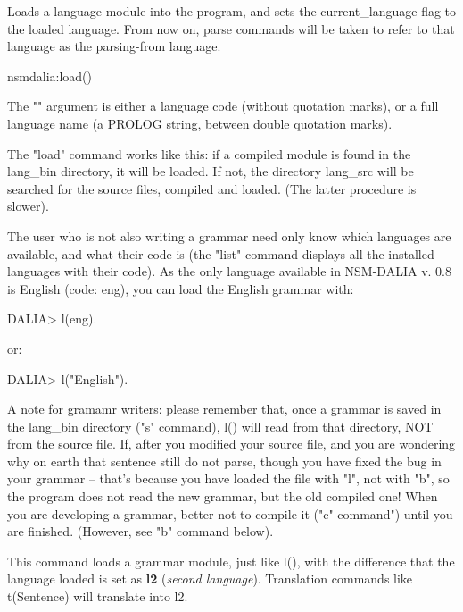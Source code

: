 \documentclass[11pt]{article}
\begin{document}
\begin{description}
Loads a language module into the program, and sets the
current_language flag to the loaded language. From now on, parse
commands will be taken to refer to that language as the parsing-from
language.

\begin{tags}
nsmdalia:load()

The "" argument is either a language code (without quotation
marks), or a full language name (a PROLOG string, between double
quotation marks).

The "load" command works like this: if a compiled module is found in
the lang_bin directory, it will be loaded. If not, the directory
lang_src will be searched for the source files, compiled and
loaded. (The latter procedure is slower).

The user who is not also writing a grammar need only know which
languages are available, and what their code is (the "list" command
displays all the installed languages with their code). As the only
language available in NSM-DALIA v. 0.8 is English (code: eng), you can
load the English grammar with:

\begin{code}
DALIA> l(eng).
\end{code}

or:

\begin{code}
DALIA> l("English").
\end{code}

A note for gramamr writers: please remember that, once a grammar is
saved in the lang_bin directory ("s" command), l() will read from
that directory, NOT from the source file. If, after you modified your
source file, and you are wondering why on earth that sentence still do
not parse, though you have fixed the bug in your grammar -- that's
because you have loaded the file with "l", not with "b", so the
program does not read the new grammar, but the old compiled one! When
you are developing a grammar, better not to compile it ("c" command")
until you are finished. (However, see "b" command below).
\end{tags}

This command loads a grammar module, just like l(), with
the difference that the language loaded is set as \textbf{l2} (\textit{second
language}). Translation commands like t(Sentence) will translate into
l2.


\end{description}
\end{document}
